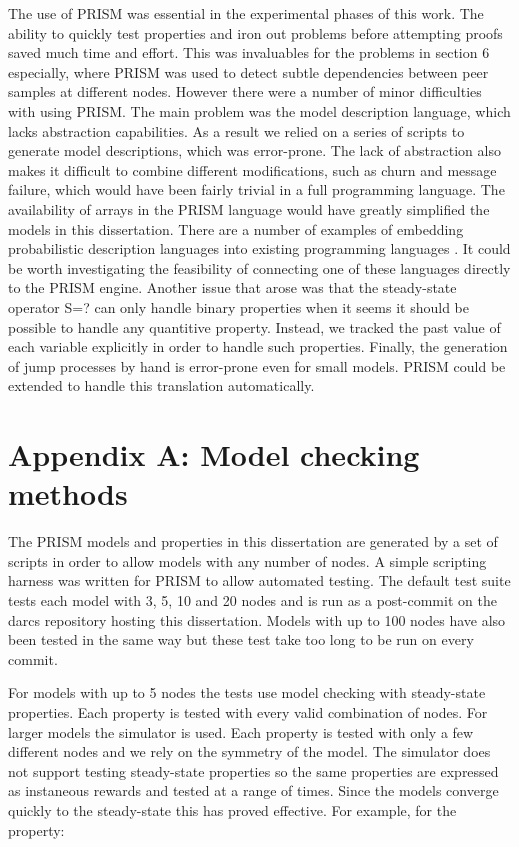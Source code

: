 \documentclass[a4paper,10pt]{article}
\begin{document}
The use of PRISM was essential in the experimental phases of this work. The ability to quickly test properties and iron out problems before attempting proofs saved much time and effort. This was invaluables for the problems in section 6 especially, where PRISM was used to detect subtle dependencies between peer samples at different nodes. However there were a number of minor difficulties with using PRISM. The main problem was the model description language, which lacks abstraction capabilities. As a result we relied on a series of scripts to generate model descriptions, which was error-prone. The lack of abstraction also makes it difficult to combine different modifications, such as churn and message failure, which would have been fairly trivial in a full programming language. The availability of arrays in the PRISM language would have greatly simplified the models in this dissertation. There are a number of examples of embedding probabilistic description languages into existing programming languages \cite{pfp, ocaml_cont}. It could be worth investigating the feasibility of connecting one of these languages directly to the PRISM engine. Another issue that arose was that the steady-state operator S=? can only handle binary properties when it seems it should be possible to handle any quantitive property. Instead, we tracked the past value of each variable explicitly in order to handle such properties. Finally, the generation of jump processes by hand is error-prone even for small models. PRISM could be extended to handle this translation automatically.



\clearpage

\section*{Appendix A: Model checking methods}

The PRISM models and properties in this dissertation are generated by a set of scripts in order to allow models with any number of nodes. A simple scripting harness was written for PRISM to allow automated testing. The default test suite tests each model with 3, 5, 10 and 20 nodes and is run as a post-commit on the darcs repository hosting this dissertation. Models with up to 100 nodes have also been tested in the same way but these test take too long to be run on every commit. 

For models with up to 5 nodes the tests use model checking with steady-state properties. Each property is tested with every valid combination of nodes. For larger models the simulator is used. Each property is tested with only a few different nodes and we rely on the symmetry of the model. The simulator does not support testing steady-state properties so the same properties are expressed as instaneous rewards and tested at a range of times. Since the models converge quickly to the steady-state this has proved effective. For example, for the property:
\end{document}

